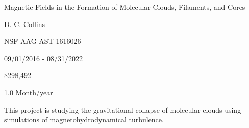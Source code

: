 
 Magnetic Fields in the Formation of Molecular Clouds,
Filaments, and Cores

 D. C. Collins

 NSF AAG  AST-1616026 

 09/01/2016 - 08/31/2022

 \$298,492 

 1.0 Month/year

 This project is studying the gravitational collapse of
molecular clouds using simulations of magnetohydrodynamical turbulence.  
